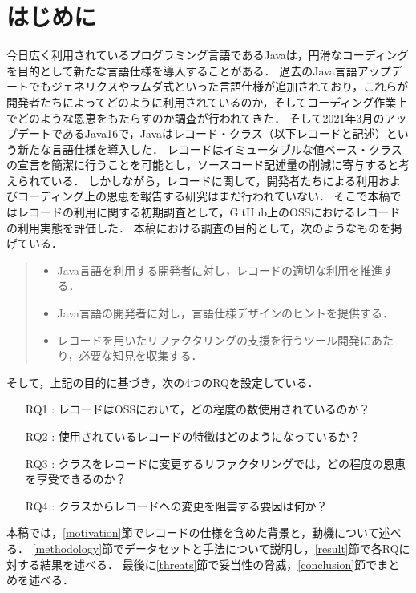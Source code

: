 \section{はじめに\label{intro}}

今日広く利用されているプログラミング言語であるJavaは，円滑なコーディングを目的として新たな言語仕様を導入することがある．
過去のJava言語アップデートでもジェネリクスやラムダ式といった言語仕様が追加されており，これらが開発者たちによってどのように利用されているのか，そしてコーディング作業上でどのような恩恵をもたらすのか調査が行われてきた\cite{Generics_Research}\cite{Lambda_Research}．
そして2021年3月のアップデートであるJava16で，Javaはレコード・クラス（以下レコードと記述）という新たな言語仕様を導入した．
レコードはイミュータブルな値ベース・クラスの宣言を簡潔に行うことを可能とし，ソースコード記述量の削減に寄与すると考えられている．
しかしながら，レコードに関して，開発者たちによる利用およびコーディング上の恩恵を報告する研究はまだ行われていない．
そこで本稿ではレコードの利用に関する初期調査として，GitHub上のOSSにおけるレコードの利用実態を評価した．
本稿における調査の目的として，次のようなものを掲げている．
\begin{quote}
  \begin{itemize}
    \item Java言語を利用する開発者に対し，レコードの適切な利用を推進する．
    \item Java言語の開発者に対し，言語仕様デザインのヒントを提供する．
    \item レコードを用いたリファクタリングの支援を行うツール開発にあたり，必要な知見を収集する．
  \end{itemize}
\end{quote}

そして，上記の目的に基づき，次の4つのRQを設定している．
\begin{itemize}
  \item[RQ1 : ] レコードはOSSにおいて，どの程度の数使用されているのか？
  \item[RQ2 : ] 使用されているレコードの特徴はどのようになっているか？
  \item[RQ3 : ] クラスをレコードに変更するリファクタリングでは，どの程度の恩恵を享受できるのか？
  \item[RQ4 : ] クラスからレコードへの変更を阻害する要因は何か？
\end{itemize}

本稿では，\ref{motivation}節でレコードの仕様を含めた背景と，動機について述べる．
\ref{methodology}節でデータセットと手法について説明し，\ref{result}節で各RQに対する結果を述べる．
最後に\ref{threats}節で妥当性の脅威，\ref{conclusion}節でまとめを述べる．